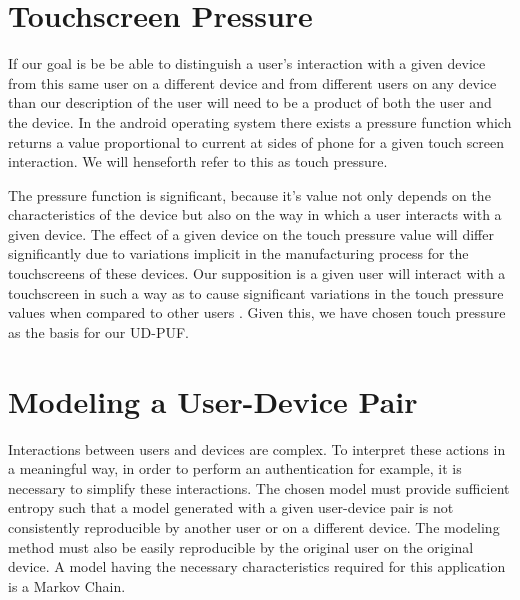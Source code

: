 \documentclass{acm_proc_article-sp}
\begin{document}
\section{Touchscreen Pressure}
\label{sec:touchscreen}
If our goal is be be able to distinguish a user's interaction with a given device from this same user on a different device and from different users on any device than our description of the user will need to be a product of both the user and the device. In the android operating system there exists a pressure function which returns a value proportional to current at sides of phone for a given touch screen interaction. \cite{zhu2013sensec} We will henseforth refer to this as touch pressure. 

The pressure function is significant, because it's value not only depends on the characteristics of the device but also on the way in which a user interacts with a given device. The effect of a given device on the touch pressure value will differ significantly due to variations implicit in the manufacturing process for the touchscreens of these devices. \cite{manufacturing_differences} Our supposition is a given user will interact with a touchscreen in such a way as to cause significant variations in the touch pressure values when compared to other users \cite{user_touchscreen_interations}.  Given this, we have chosen touch pressure as the basis for our UD-PUF.

\section{Modeling a User-Device Pair}
\label{sec:modeling}
Interactions between users and devices are complex. To interpret these actions in a meaningful way, in order to perform an authentication for example, it is necessary to simplify these interactions. The chosen model must provide sufficient entropy such that a model generated with a given user-device pair is not consistently reproducible by another user or on a different device. The modeling method must also be easily reproducible by the original user on the original device. A model having the necessary characteristics required for this application is a Markov Chain.
\end{document}

